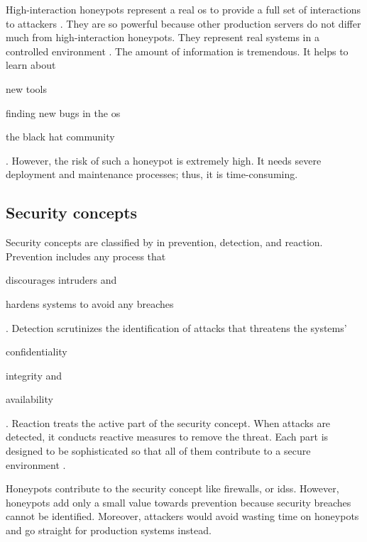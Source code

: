 High-interaction honeypots represent a real \ac{os} to provide a full set of interactions to attackers \cite{Spitzner2003}.
They are so powerful because other production servers do not differ much from high-interaction honeypots.
They represent real systems in a controlled environment \cite{Spitzner2003,Mokube2007}.
The amount of information is tremendous.
It helps to learn about
\begin{enumerate*}[label=(\roman*)]
    \item new tools
    \item finding new bugs in the \ac{os}
    \item the black hat community
\end{enumerate*} \cite{Spitzner2003}.
However, the risk of such a honeypot is extremely high.
It needs severe deployment and maintenance processes; thus, it is time-consuming.

\subsection{Security concepts}
\label{subsec:honeypot-security-concept}

Security concepts are classified by \citet{Schneier2004} in prevention, detection, and reaction.
Prevention includes any process that
\begin{enumerate*}[label=(\roman*)]
    \item discourages intruders and
    \item hardens systems to avoid any breaches
\end{enumerate*}.
Detection scrutinizes the identification of attacks that threatens the systems'
\begin{enumerate*}[label=(\roman*)]
    \item confidentiality
    \item integrity and
    \item availability
\end{enumerate*}.
Reaction treats the active part of the security concept.
When attacks are detected, it conducts reactive measures to remove the threat.
Each part is designed to be sophisticated so that all of them contribute to a secure environment \cite{NawrockiWSKS2016}.

Honeypots contribute to the security concept like firewalls, or \acp{ids}.
However, honeypots add only a small value towards prevention because security breaches cannot be identified.
Moreover, attackers would avoid wasting time on honeypots and go straight for production systems instead.

